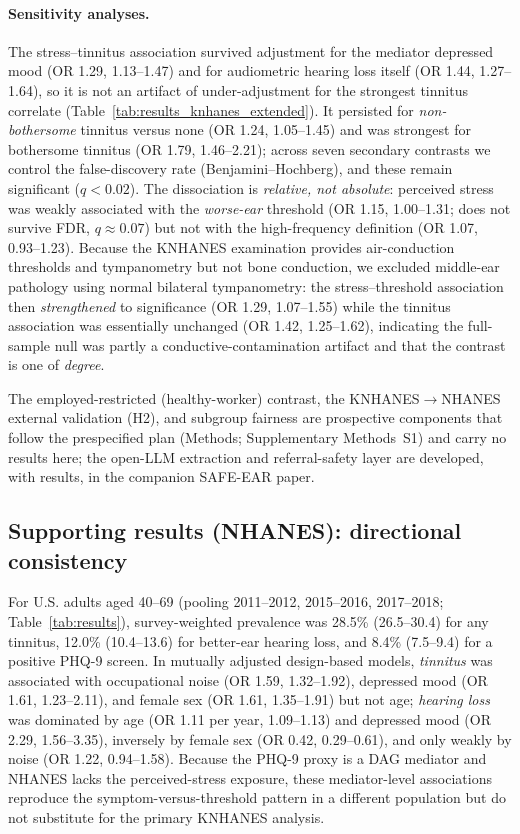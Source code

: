 \paragraph{Sensitivity analyses.} The stress--tinnitus association survived
adjustment for the mediator depressed mood (OR 1.29, 1.13--1.47) and for
audiometric hearing loss itself (OR 1.44, 1.27--1.64), so it is not an artifact of
under-adjustment for the strongest tinnitus correlate
(Table~\ref{tab:results_knhanes_extended}). It persisted for \emph{non-bothersome}
tinnitus versus none (OR 1.24, 1.05--1.45) and was strongest for bothersome
tinnitus (OR 1.79, 1.46--2.21); across seven secondary contrasts we control the
false-discovery rate (Benjamini--Hochberg), and these remain significant
($q<0.02$). The dissociation is \emph{relative, not absolute}: perceived stress
was weakly associated with the \emph{worse-ear} threshold (OR 1.15, 1.00--1.31;
does not survive FDR, $q\approx0.07$) but not with the high-frequency definition
(OR 1.07, 0.93--1.23). Because the KNHANES examination provides air-conduction
thresholds and tympanometry but not bone conduction, we excluded middle-ear
pathology using normal bilateral tympanometry: the stress--threshold association
then \emph{strengthened} to significance (OR 1.29, 1.07--1.55) while the tinnitus
association was essentially unchanged (OR 1.42, 1.25--1.62), indicating the
full-sample null was partly a conductive-contamination artifact and that the
contrast is one of \emph{degree}.

The employed-restricted (healthy-worker) contrast, the KNHANES$\rightarrow$NHANES
external validation (H2), and subgroup fairness are prospective components that
follow the prespecified plan (Methods; Supplementary Methods~S1) and carry no
results here; the open-LLM extraction and referral-safety layer are developed,
with results, in the companion SAFE-EAR paper.

\subsection{Supporting results (NHANES): directional consistency}
For U.S. adults aged 40--69 (pooling 2011--2012, 2015--2016, 2017--2018;
Table~\ref{tab:results}), survey-weighted prevalence was 28.5\% (26.5--30.4) for
any tinnitus, 12.0\% (10.4--13.6) for better-ear hearing loss, and 8.4\% (7.5--9.4)
for a positive PHQ-9 screen. In mutually adjusted design-based models,
\emph{tinnitus} was associated with occupational noise (OR 1.59, 1.32--1.92),
depressed mood (OR 1.61, 1.23--2.11), and female sex (OR 1.61, 1.35--1.91) but not
age; \emph{hearing loss} was dominated by age (OR 1.11 per year, 1.09--1.13) and
depressed mood (OR 2.29, 1.56--3.35), inversely by female sex (OR 0.42,
0.29--0.61), and only weakly by noise (OR 1.22, 0.94--1.58). Because the PHQ-9
proxy is a DAG mediator and NHANES lacks the perceived-stress exposure, these
mediator-level associations reproduce the symptom-versus-threshold pattern in a
different population but do not substitute for the primary KNHANES analysis.
